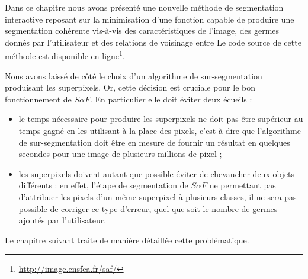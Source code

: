 Dans ce chapitre\modif{,} nous avons présenté une nouvelle méthode de segmentation interactive reposant sur la minimisation d'une fonction  capable de produire une segmentation cohérente vis-à-vis des caractéristiques de l'image, des germes donnés par l'utilisateur et des relations de voisinage entre  Le code source de cette méthode est disponible en ligne\footnote{\url{http://image.ensfea.fr/saf/}}.

Nous avons  laissé de côté le choix d'un algorithme de sur-segmentation produisant les superpixels. Or, cette décision est cruciale pour le bon fonctionnement de $S \alpha F$. En particulier elle doit éviter deux écueils :
\begin{itemize}
\item le temps nécessaire pour produire les superpixels ne doit pas être supérieur au temps gagné en les utilisant à la place des pixels, c'est-à-dire que l'algorithme de sur-segmentation doit être en mesure de fournir un résultat en quelques secondes pour une image de plusieurs millions de pixel ;
\item les superpixels doivent autant que possible éviter de chevaucher deux objets différents : en effet, l'étape de segmentation de $S \alpha F$ ne permettant pas d'attribuer les pixels d'un même superpixel à plusieurs classes, il ne sera pas possible de corriger ce type d'erreur, quel que soit le nombre de germes ajoutés par l'utilisateur.
\end{itemize}
Le chapitre suivant traite de manière détaillée cette problématique. 
